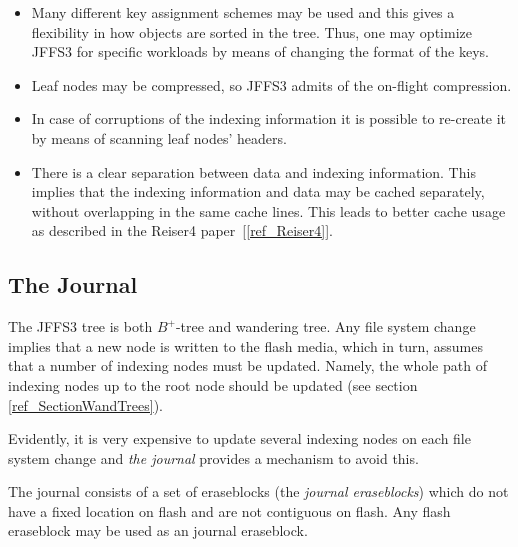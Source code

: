 \documentclass[12pt,a4paper,oneside,titlepage]{article}
\begin{document}
\begin{itemize}

\item Many different key assignment schemes may be used and this gives a
flexibility in how objects are sorted in the tree. Thus, one may optimize JFFS3
for specific workloads by means of changing the format of the keys.

\item Leaf nodes may be compressed, so JFFS3 admits of the \mbox{on-flight}
compression.

\item In case of corruptions of the indexing information it is possible to
\mbox{re-create} it by means of scanning leaf nodes' headers.

\item There is a clear separation between data and indexing information. This
implies that the indexing information and data may be cached separately,
without overlapping in the same cache lines. This leads to better cache usage
as described in the Reiser4 paper~[\ref{ref_Reiser4}].

\end{itemize}

%
%
\subsection{The Journal} \label{ref_SectionJournalIntro}

The JFFS3 tree is both \mbox{$B^+$-tree} and wandering tree. Any file system
change implies that a new node is written to the flash media, which in turn,
assumes that a number of indexing nodes must be updated. Namely, the whole path
of indexing nodes up to the root node should be updated (see section
\ref{ref_SectionWandTrees}).

Evidently, it is very expensive to update several indexing nodes on each file
system change and \emph{the journal} provides a mechanism to avoid this.

The journal consists of a set of eraseblocks (the \emph{journal eraseblocks})
which do not have a fixed location on flash and are not contiguous on flash.
Any flash eraseblock may be used as an journal eraseblock.
\end{document}
